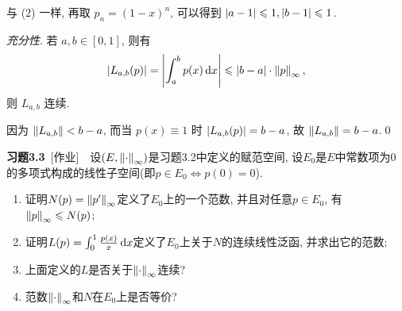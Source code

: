 \begin{Proof}
        与 (2) 一样, 再取 $ p_{n}=(1-x)^{n} $, 可以得到 $ \left| a-1 \right| \leqslant1, \left| b-1 \right| \leqslant1 $.

        \textsl{充分性}. 若 $ a, b\in[0, 1] $, 则有
        \[
            \left| L_{a, b}(p) \right| =\left| \int_{a}^{b}p(x)\,\mathrm{d} x \right| \leqslant \left| b-a \right| \cdot \left\| p \right\|_{\infty},
        \]
        则 $ L_{a, b} $ 连续. 

        因为 $ \left\| L_{a, b} \right\|<b-a $, 而当 $ p(x)\equiv 1 $ 时 $ \left| L_{a, b}(p) \right| =b-a $, 故 $ \left\| L_{a, b} \right\|=b-a $.\qed
    \end{Proof}

    \textbf{习题3.3}\ [作业]\ \ 设$ (E,\left\| \cdot \right\|_\infty) $是习题3.2中定义的赋范空间, 设$ E_0 $是$ E $中常数项为0的多项式构成的线性子空间(即$ p\in E_0\Longleftrightarrow p(0)=0 $).
    \begin{enumerate}[(1)]
    \item 证明$ N(p)=\left\| p' \right\|_\infty $定义了$ E_0 $上的一个范数, 并且对任意$ p\in E_0 $, 有$ \left\| p \right\|_\infty\leqslant N(p) $;
    \item 证明$ L(p)=\int_0^1\frac{p(x)}{x}\,\mathrm{d} x $定义了$ E_0 $上关于$ N $的连续线性泛函, 并求出它的范数;
    \item 上面定义的$ L $是否关于$ \left\| \cdot \right\|_\infty $连续?
    \item 范数$ \left\| \cdot \right\|_\infty $和$ N $在$ E_0 $上是否等价?
    \end{enumerate}

